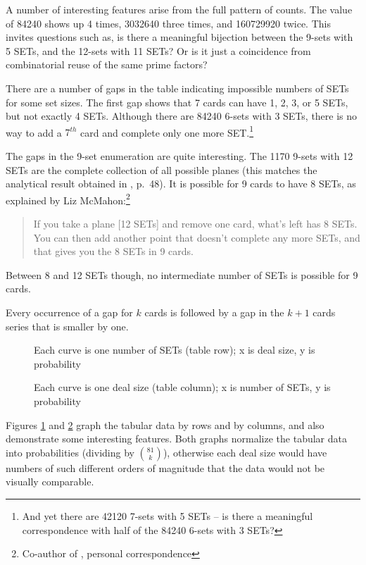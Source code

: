 \documentclass[10pt]{amsart}
\begin{document}
A number of interesting features arise from the full pattern of counts. The
value of 84240 shows up 4 times, 3032640 three times, and 160729920 twice. This
invites questions such as, is there a meaningful bijection between the 9-sets
with 5 SETs, and the 12-sets with 11 SETs? Or is it just a coincidence from
combinatorial reuse of the same prime factors?


There are a number of gaps in the table indicating impossible numbers of SETs
for some set sizes. The first gap shows that 7 cards can have 1, 2, 3, or 5
SETs, but not exactly 4 SETs. Although there are 84240 6-sets with 3 SETs, there
is no way to add a $7^{th}$ card and complete only one more SET.\footnote{And
  yet there are 42120 7-sets with 5 SETs -- is there a meaningful correspondence
  with half of the 84240 6-sets with 3 SETs?}

The gaps in the 9-set enumeration are quite interesting. The 1170 9-sets with 12
SETs are the complete collection of all possible planes (this matches the
analytical result obtained in \cite{JOS}, p.~48). It is possible for 9 cards to
have 8 SETs, as explained by Liz McMahon:\footnote{Co-author of \cite{JOS},
  personal correspondence}
\begin{quote}
If you take a plane [12 SETs] and remove one card, what's left has 8 SETs.  You
can then add another point that doesn't complete any more SETs, and that gives
you the 8 SETs in 9 cards.
\end{quote}
Between 8 and 12 SETs though, no intermediate number of SETs is possible for 9
cards.

Every occurrence of a gap for $k$ cards is followed by a gap in the $k+1$ cards
series that is smaller by one.

\begin{figure}[!htb]
  \caption{\label{FIGROWS} Each curve is one number of SETs (table row); x is
    deal size, y is probability}
\end{figure}

\begin{figure}[!htb]
  \caption{\label{FIGCOLS} Each curve is one deal size (table column); x is
    number of SETs, y is probability}
\end{figure}

Figures \ref{FIGROWS} and \ref{FIGCOLS} graph the tabular data by rows and by
columns, and also demonstrate some interesting features. Both graphs normalize
the tabular data into probabilities (dividing by $\binom{81}{k}$), otherwise
each deal size would have numbers of such different orders of magnitude that the
data would not be visually comparable.
\end{document}
